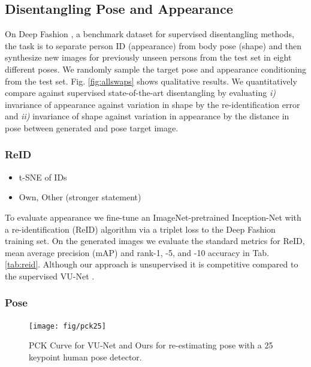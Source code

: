 
	\subsection{Disentangling Pose and Appearance}

	On Deep Fashion \cite{liu16deepfashion, liu16deepfashionwild}, a benchmark dataset for supervised disentangling methods, the task is to separate person ID (appearance) from body pose (shape) and then synthesize new images for previously unseen persons from the test set in eight different poses. We randomly sample the target pose and appearance conditioning from the test set. Fig. \ref{fig:allswaps} shows qualitative results.
	We quantitatively compare against supervised state-of-the-art disentangling \cite{esser18} by evaluating \emph{i)} invariance of appearance against variation in shape by the re-identification error and \emph{ii)} invariance of shape against variation in appearance by the distance in pose between generated and pose target image.

	\subsubsection{ReID}
	\begin{itemize}
		\item t-SNE of IDs
		\item Own, Other (stronger statement)
	\end{itemize}
	To evaluate appearance we fine-tune an ImageNet-pretrained \cite{russakovsky15imagenet} Inception-Net \cite{szegedy15inception} with a re-identification (ReID) algorithm \cite{xiao17reidjoint} via a triplet loss \cite{hermans17reidtriplet} to the Deep Fashion training set.
	On the generated images we evaluate the standard metrics for ReID, mean average precision (mAP) and rank-1, -5, and -10 accuracy in Tab. \ref{tab:reid}.
	Although our approach is unsupervised it is competitive compared to the supervised VU-Net \cite{esser18}.


	\subsubsection{Pose}
	\begin{figure}[htp]
		\centering
		\texttt{[image: fig/pck25]}
		\caption{PCK Curve for VU-Net \cite{esser18} and Ours for re-estimating pose with a 25 keypoint human pose detector.}
		\label{fig:pckcurve}
	\end{figure}


